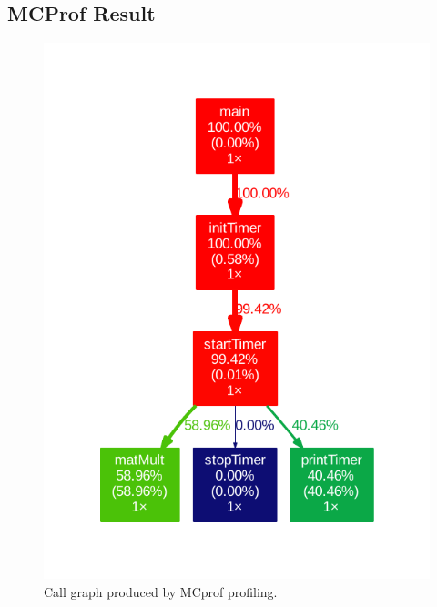 \documentclass[final]{article} %
\begin{document}
\begin{appendices}


\section{MCProf Result}\label{app:appendix-mcprof-result}

\begin{figure}[H]
\centering
\includegraphics[scale=0.7]{resources/callgraphAll.pdf}
\caption{Call graph produced by MCprof profiling.}
\label{fig:callgraphall}
\end{figure}



\end{appendices}
\end{document}
